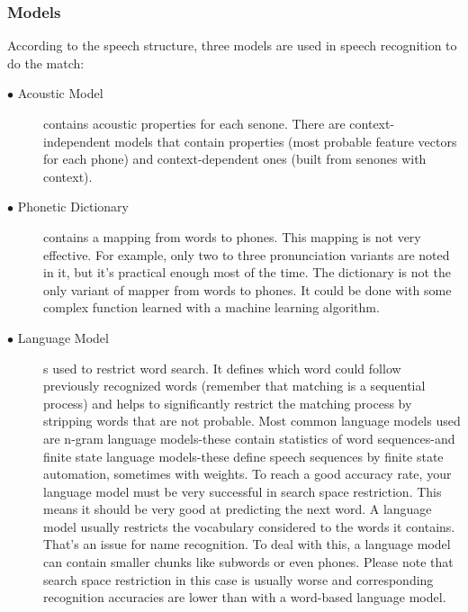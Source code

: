 \documentclass[12pt,a4paper,oldfontcommands]{memoir}
\begin{document}
\subsubsection{Models}
According to the speech structure, three models are used in speech recognition to do the match:
\begin{description}
  \item[$\bullet$ Acoustic Model] contains acoustic properties for each senone. There are context-independent models that contain properties (most probable feature vectors for each phone) and context-dependent ones (built from senones with context). 
  \item[$\bullet$ Phonetic Dictionary]
contains a mapping from words to phones. This mapping is not very effective. For example, only two to three pronunciation variants are noted in it, but it's practical enough most of the time. The dictionary is not the only variant of mapper from words to phones. It could be done with some complex function learned with a machine learning algorithm. 

  \item[$\bullet$ Language Model]
	s used to restrict word search. It defines which word could follow previously recognized words (remember that matching is a sequential process) and helps to significantly restrict the matching process by stripping words that are not probable. Most common language models used are n-gram language models-these contain statistics of word sequences-and finite state language models-these define speech sequences by finite state automation, sometimes with weights. To reach a good accuracy rate, your language model must be very successful in search space restriction. This means it should be very good at predicting the next word. A language model usually restricts the vocabulary considered to the words it contains. That's an issue for name recognition. To deal with this, a language model can contain smaller chunks like subwords or even phones. Please note that search space restriction in this case is usually worse and corresponding recognition accuracies are lower than with a word-based language model.

\end{description}
\end{document}
